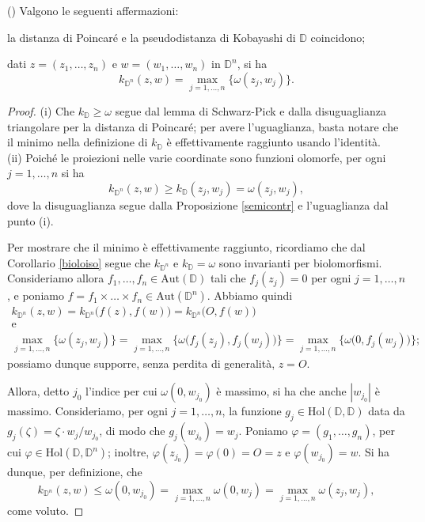 \begin{prop} \label{k_polidisco}
    (\cite[Proposition 2.3.4 and Corollary 2.3.7]{A1}) Valgono le seguenti affermazioni:
    \begin{nlist}
        \item la distanza di Poincaré e la pseudodistanza di Kobayashi di $\mathbb{D}$ coincidono;
        \item dati $z=(z_1,\dots,z_n)$ e $w=(w_1,\dots,w_n)$ in $\mathbb{D}^n$, si ha
        $$k_{\mathbb{D}^n}(z,w)=\max_{j=1,\dots,n}\{\omega(z_j,w_j)\}.$$
    \end{nlist}
\end{prop}
\begin{proof}
    (i) Che $k_{\mathbb{D}}\ge\omega$ segue dal lemma di Schwarz-Pick e dalla disuguaglianza triangolare per la distanza di Poincaré; per avere l'uguaglianza, basta notare che il minimo nella definizione di $k_{\mathbb{D}}$ è effettivamente raggiunto usando l'identità.\\

    (ii) Poiché le proiezioni nelle varie coordinate sono funzioni olomorfe, per ogni $j=1,\dots, n$ si ha
    $$k_{\mathbb{D}^n}(z,w) \ge k_{\mathbb{D}}(z_j,w_j)=\omega(z_j,w_j),$$
    dove la disuguaglianza segue dalla Proposizione \ref{semicontr} e l'uguaglianza dal punto (i).

    Per mostrare che il minimo è effettivamente raggiunto, ricordiamo che dal Corollario \ref{bioloiso} segue che $k_{\mathbb{D}^n}$ e $k_{\mathbb{D}}=\omega$ sono invarianti per biolomorfismi. Consideriamo allora $f_1,\dots, f_n \in \text{Aut}(\mathbb{D})$ tali che $f_j(z_j)=0$ per ogni $j=1,\dots,n$, e poniamo $f=f_1\times\dots\times f_n\in\text{Aut}(\mathbb{D}^n)$. Abbiamo quindi
    \begin{gather*}
        k_{\mathbb{D}^n}(z,w)=k_{\mathbb{D}^n}\big(f(z),f(w)\big)=k_{\mathbb{D}^n}\big(O,f(w)\big)\\
        \text{e}\\
        \max_{j=1,\dots,n}\{\omega(z_j,w_j)\}=\max_{j=1,\dots,n}\big\{\omega\big(f_j(z_j),f_j(w_j)\big)\big\}=\max_{j=1,\dots,n}\big\{\omega\big(0,f_j(w_j)\big)\big\};
    \end{gather*}
    possiamo dunque supporre, senza perdita di generalità, $z=O$.
    
    Allora, detto $j_0$ l'indice per cui $\omega(0,w_{j_0})$ è massimo, si ha che anche $|w_{j_0}|$ è massimo. Consideriamo, per ogni $j=1,\dots,n$, la funzione $g_j \in\text{Hol}(\mathbb{D},\mathbb{D})$ data da $g_j(\zeta)=\zeta\cdot w_j/w_{j_0}$, di modo che $g_j(w_{j_0})=w_j$. Poniamo $\varphi=(g_1,\dots,g_n)$, per cui $\varphi\in\text{Hol}(\mathbb{D},\mathbb{D}^n)$; inoltre, $\varphi(z_{j_0})=\varphi(0)=O=z$ e $\varphi(w_{j_0})=w$. Si ha dunque, per definizione, che
    $$k_{\mathbb{D}^n}(z,w) \le \omega(0,w_{j_0})=\max_{j=1,\dots,n}\omega(0,w_j)=\max_{j=1,\dots,n}\omega(z_j,w_j),$$
    come voluto.
\end{proof}

